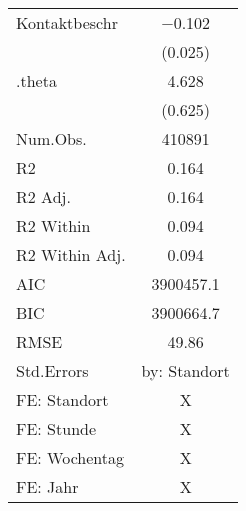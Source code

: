 \begin{table}
\begin{tabular}[t]{lc}
Kontaktbeschr & \num{-0.102}\\
 & (\num{0.025})\\
.theta & \num{4.628}\\
 & (\num{0.625})\\
\midrule
Num.Obs. & \num{410891}\\
R2 & \num{0.164}\\
R2 Adj. & \num{0.164}\\
R2 Within & \num{0.094}\\
R2 Within Adj. & \num{0.094}\\
AIC & \num{3900457.1}\\
BIC & \num{3900664.7}\\
RMSE & \num{49.86}\\
Std.Errors & by: Standort\\
FE: Standort & X\\
FE: Stunde & X\\
FE: Wochentag & X\\
FE: Jahr & X\\
\bottomrule
\end{tabular}
\end{table}
